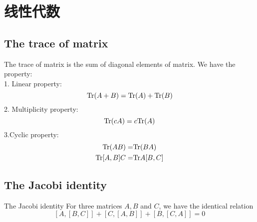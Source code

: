 \chapter{线性代数}

\section{The trace of matrix}
The trace of matrix is the sum of diagonal elements of matrix. We have the property:\\
1. Linear property:
\begin{equation}
    {\rm Tr}(A+B) = {\rm Tr}(A) +{\rm Tr}(B)  \label{tracelinear}
\end{equation}
2. Multiplicity property:
\begin{equation}
    {\rm Tr}(cA) = c{\rm Tr}(A)  \label{tracemulti}
\end{equation}
3.Cyclic property:
\begin{equation}
  \begin{aligned}
    {\rm Tr}(AB) =& {\rm Tr}(BA)\\  \label{tracecyclic}
    {\rm Tr}[A,B]C =& {\rm Tr}A[B,C]
  \end{aligned}
\end{equation}


\section{The Jacobi identity}
\begin{theorem}{The Jacobi identity}{}
  For three matrices $A, B$ and $C$, we have the identical relation
  \begin{equation}
    \left[A, [B,C]\right] + \left[C, [A,B]\right] + \left[B, [C,A]\right] = 0 \label{Jacobidentity}
  \end{equation}
\end{theorem}